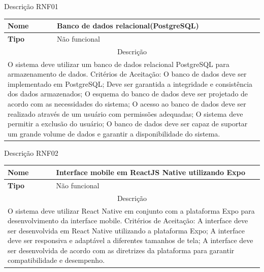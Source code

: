 \clearpage
\begin{quadro}[htb]
	\centering
	\caption{\label{Formatação do texto.}Descrição RNF01}	
	\begin{tabular}{|l|p{11cm}|}
		\hline
		\textbf{Nome}    & Banco de dados relacional(PostgreSQL)\\ \hline
		\textbf{Tipo}    & Não funcional\\ \hline
		\multicolumn{2}{|c|}{Descrição}\\ \hline
		\multicolumn{2}{|p{12cm}|}{
			O sistema deve utilizar um banco de dados relacional PostgreSQL para armazenamento de dados. \newline
			\newline Critérios de Aceitação: \newline
			O banco de dados deve ser implementado em PostgreSQL;
			Deve ser garantida a integridade e consistência dos dados armazenados;\newline
			\newline O esquema do banco de dados deve ser projetado de acordo com as necessidades do sistema; \newline
			\newline O acesso ao banco de dados deve ser realizado através de um usuário com permissões adequadas; \newline
			\newline O sistema deve permitir a exclusão do usuário; \newline
			O banco de dados deve ser capaz de suportar um grande volume de dados e garantir a disponibilidade do sistema.
			} \\ \hline
	\end{tabular}
\end{quadro}

\clearpage
\begin{quadro}[htb]
	\centering
	\caption{\label{Formatação do texto.}Descrição RNF02}	
	\begin{tabular}{|l|p{11cm}|}
		\hline
		\textbf{Nome}    & Interface mobile em ReactJS Native utilizando Expo\\ \hline
		\textbf{Tipo}    & Não funcional\\ \hline
		\multicolumn{2}{|c|}{Descrição}\\ \hline
		\multicolumn{2}{|p{12cm}|}{
			O sistema deve utilizar React Native em conjunto com a plataforma Expo para desenvolvimento da interface mobile. \newline
			\newline Critérios de Aceitação: \newline
			A interface deve ser desenvolvida em React Native utilizando a plataforma Expo; \newline
			\newline A interface deve ser responsiva e adaptável a diferentes tamanhos de tela;\newline
			\newline A interface deve ser desenvolvida de acordo com as diretrizes da plataforma para garantir compatibilidade e desempenho.
			} \\ \hline
	\end{tabular}
\end{quadro}